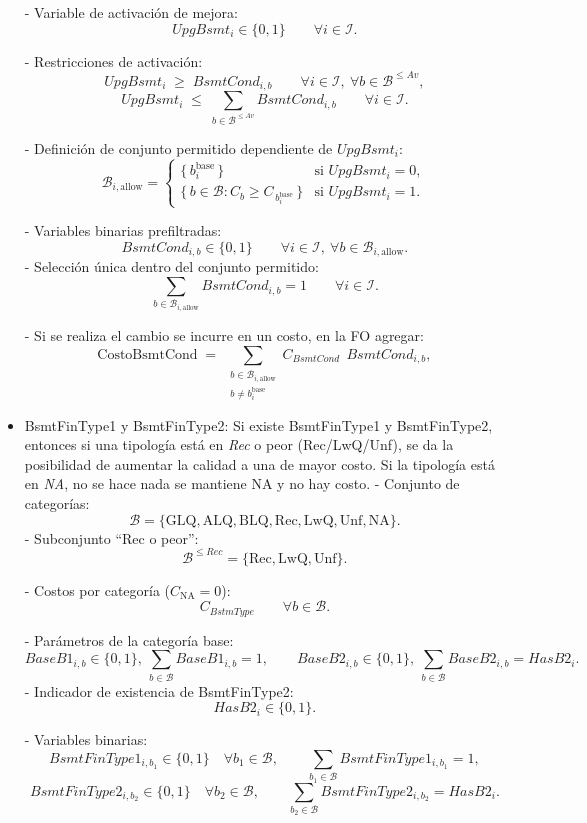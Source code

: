 \begin{itemize}
- Variable de activación de mejora:
\[
  UpgBsmt_i \in \{0,1\} \qquad \forall i \in \mathcal{I}.
\]

- Restricciones de activación:
\[
  UpgBsmt_i \;\ge\; BsmtCond_{i,b} \qquad \forall i \in \mathcal{I},\ \forall b \in \mathcal{B}^{\le Av},
\]
\[
  UpgBsmt_i \;\le\; \sum_{b \in \mathcal{B}^{\le Av}} BsmtCond_{i,b} \qquad \forall i \in \mathcal{I}.
\]

- Definición de conjunto permitido dependiente de $UpgBsmt_i$:
\[
  \mathcal{B}_{i,\text{allow}} =
  \begin{cases}
    \{\, b_i^{\text{base}} \,\} & \text{si } UpgBsmt_i = 0,\\[4pt]
    \{\, b \in \mathcal{B} : C_b \ge C_{\,b_i^{\text{base}}} \,\} & \text{si } UpgBsmt_i = 1.
  \end{cases}
\]

- Variables binarias prefiltradas:
\[
  BsmtCond_{i,b} \in \{0,1\} \qquad \forall i \in \mathcal{I},\ \forall b \in \mathcal{B}_{i,\text{allow}}.
\]
- Selección única dentro del conjunto permitido:
\[
  \sum_{b \in \mathcal{B}_{i,\text{allow}}} BsmtCond_{i,b} = 1 \qquad \forall i \in \mathcal{I}.
\]

- Si se realiza el cambio se incurre en un costo, en la FO agregar:
\[
  \text{CostoBsmtCond}
  \;=\;
  \sum_{\substack{b \in \mathcal{B}_{i,\text{allow}} \\ b \neq b_i^{\text{base}}}}
  C_{BsmtCond} \;\, BsmtCond_{i,b},
\]

    \item BsmtFinType1 y BsmtFinType2: Si existe BsmtFinType1 y  BsmtFinType2, entonces si una tipología está en \emph{Rec} o peor (Rec/LwQ/Unf), se da la posibilidad de aumentar la calidad a una de mayor costo. Si la tipología está en \emph{NA}, no se hace nada se mantiene NA y no hay costo.
- Conjunto de categorías:
\[
  \mathcal{B}=\{\text{GLQ},\text{ALQ},\text{BLQ},\text{Rec},\text{LwQ},\text{Unf},\text{NA}\}.
\]
- Subconjunto “Rec o peor”:
\[
  \mathcal{B}^{\le Rec}=\{\text{Rec},\text{LwQ},\text{Unf}\}.
\]

- Costos por categoría ($C_{\text{NA}}=0$):
\[
  C_{BstmType} \qquad \forall b\in\mathcal{B}.
\]

- Parámetros de la categoría base:
\[
  BaseB1_{i,b}\in\{0,1\},\ \sum_{b\in\mathcal{B}} BaseB1_{i,b}=1,\qquad
  BaseB2_{i,b}\in\{0,1\},\ \sum_{b\in\mathcal{B}} BaseB2_{i,b}=HasB2_i.
\]
- Indicador de existencia de BsmtFinType2:
\[
  HasB2_i\in\{0,1\}.
\]

- Variables binarias:
\[
  BsmtFinType1_{i,b_1}\in\{0,1\} \quad \forall b_1\in\mathcal{B},\qquad
  \sum_{b_1\in\mathcal{B}} BsmtFinType1_{i,b_1}=1,
\]
\[
  BsmtFinType2_{i,b_2}\in\{0,1\} \quad \forall b_2\in\mathcal{B},\qquad
  \sum_{b_2\in\mathcal{B}} BsmtFinType2_{i,b_2}=HasB2_i.
\]


\end{itemize}
